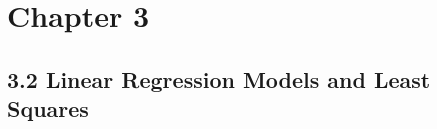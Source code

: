 \documentclass{article}
\begin{document}
\section{Chapter 3}
\subsection{3.2  Linear Regression Models and Least Squares}
\end{document}
